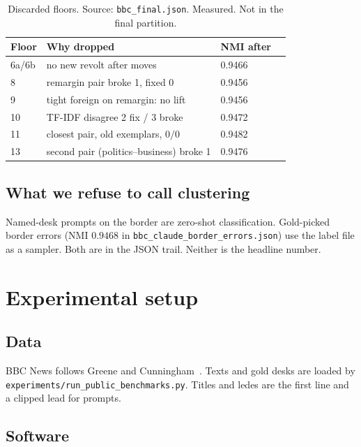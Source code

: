 \documentclass[11pt,a4paper]{article}
\begin{document}
\begin{table}[t]
\centering
\caption{Discarded floors. Source: \texttt{bbc\_final.json}.
Measured. Not in the final partition.}
\label{tab:discarded}
\small
\begin{tabular}{llp{}c}
\toprule
Floor & Why dropped & NMI after \\
\midrule
6a/6b & no new revolt after moves & 0.9466 \\
8 & remargin pair broke 1, fixed 0 & 0.9456 \\
9 & tight foreign on remargin: no lift & 0.9456 \\
10 & TF-IDF disagree 2 fix / 3 broke & 0.9472 \\
11 & closest pair, old exemplars, $0/0$ & 0.9482 \\
13 & second pair (politics--business) broke 1 & 0.9476 \\
\bottomrule
\end{tabular}
\end{table}

\subsection{What we refuse to call clustering}

Named-desk prompts on the border are zero-shot
classification. Gold-picked border errors (NMI $0.9468$ in
\texttt{bbc\_claude\_border\_errors.json}) use the label file
as a sampler. Both are in the JSON trail. Neither is the
headline number.

\section{Experimental setup}

\subsection{Data}

BBC News follows Greene and Cunningham~\cite{greene2006bbc}.
Texts and gold desks are loaded by
\texttt{experiments/run\_public\_benchmarks.py}. Titles and
ledes are the first line and a clipped lead for prompts.

\subsection{Software}
\end{document}
